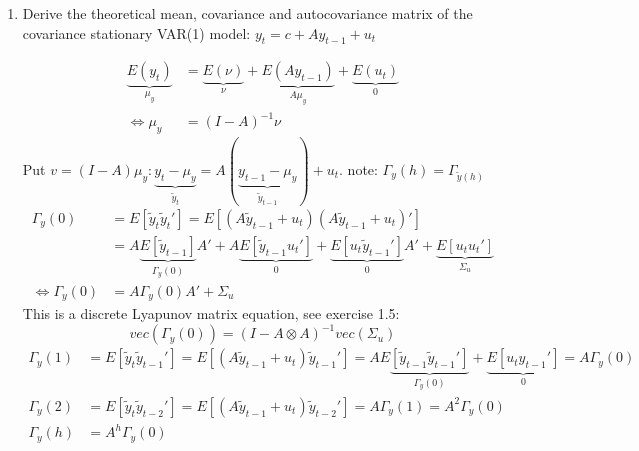 \begin{enumerate}
    \item Derive the theoretical mean, covariance and autocovariance matrix of the covariance stationary VAR(1) model: $y_t = c + A y_{t-1} + u_t$
          \begin{solution}
              \begin{align*}
                  \underbrace{E(y_t)}_{\mu_y} & = \underbrace{E(\nu)}_{\nu} + \underbrace{E(A y_{t-1})}_{A \mu_y} + \underbrace{E(u_t)}_{0} \\
                  \Leftrightarrow \mu_y       & = (I-A)^{-1} \nu
              \end{align*}
              Put $v = (I-A)\mu_y: \underbrace{y_t -\mu_y}_{\tilde{y}_{t}} = A(\underbrace{y_{t-1}-\mu_y}_{\tilde{y}_{t-1}}) + u_t$. note: $\Gamma_y(h) = \Gamma_{\tilde{y}(h)}$
              \begin{align*}
                  \Gamma_y(0)
                   & = E\left[\tilde{y}_t \tilde{y}_t'\right]= E\left[(A \tilde{y}_{t-1} + u_t)(A \tilde{y}_{t-1} + u_t)'\right]
                  \\
                   & = A \underbrace{E\left[\tilde{y}_{t-1}\right]}_{\Gamma_y(0)} A' + A \underbrace{E\left[\tilde{y}_{t-1}u_t'\right]}_{0} + \underbrace{E\left[u_t \tilde{y}_{t-1}'\right]}_{0} A' + \underbrace{E\left[u_t u_t'\right]}_{\Sigma_u}
                  \\
                  \Leftrightarrow \Gamma_y(0)
                   & = A \Gamma_y(0) A' + \Sigma_u
              \end{align*}
              This is a discrete Lyapunov matrix equation, see exercise 1.5: $$vec(\Gamma_y(0)) = (I-A \otimes A)^{-1} vec(\Sigma_u)$$
              \begin{align*}
                  \Gamma_y(1) & =  E\left[\tilde{y}_t \tilde{y}_{t-1}'\right]= E\left[(A \tilde{y}_{t-1} + u_t)\tilde{y}_{t-1}'\right] = A E\underbrace{\left[\tilde{y}_{t-1}\tilde{y}_{t-1}'\right]}_{\Gamma_y(0)} + \underbrace{E\left[u_t y_{t-1}'\right]}_{0} = A \Gamma_y(0) \\
                  \Gamma_y(2) & =  E\left[\tilde{y}_t \tilde{y}_{t-2}'\right]= E\left[(A \tilde{y}_{t-1} + u_t)\tilde{y}_{t-2}'\right] = A \Gamma_y(1) = A^2 \Gamma_y(0)                                                                                                          \\
                  \Gamma_y(h) & = A^h \Gamma_y(0)
              \end{align*}
          \end{solution}


\end{enumerate}
